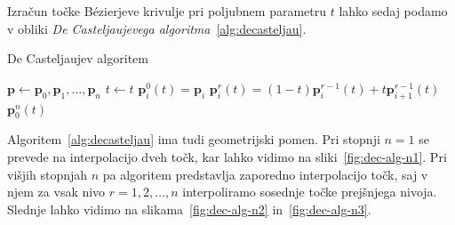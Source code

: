 \documentclass[isrm2, tisk]{fmfdelo}
\newcommand{\p}{\mathbf{p}}
\begin{document}
    \noindent Izračun točke Bézierjeve krivulje pri poljubnem parametru $t$ lahko sedaj podamo v obliki \textit{De Casteljaujevega algoritma}~\ref{alg:decasteljau}.
    \begin{algorithm}[H]
        \caption{De Casteljaujev algoritem}
        \label{alg:decasteljau}
        \begin{algorithmic}
            \State $\p \gets \p_0,\p_1,\dots,\p_n$
            \State $t \gets t$
                \State $\p_i^0(t)=\p_i$
            \EndFor
                    \State $\p_i^r(t)=(1-t)\p_i^{r-1}(t)+t\p_{i+1}^{r-1}(t)$
                \EndFor
            \EndFor
            \State \Return $\p_0^n(t)$
        \end{algorithmic}
    \end{algorithm}
    \noindent Algoritem~\ref{alg:decasteljau} ima tudi geometrijski pomen.
    Pri stopnji $n=1$ se prevede na interpolacijo dveh točk, kar lahko vidimo na sliki~\ref{fig:dec-alg-n1}.
    Pri višjih stopnjah $n$ pa algoritem predstavlja zaporedno interpolacijo točk, saj v njem za vsak nivo $r=1,2,\ldots,n$ interpoliramo sosednje točke prejšnjega nivoja.
    Slednje lahko vidimo na slikama~\ref{fig:dec-alg-n2} in~\ref{fig:dec-alg-n3}.
\end{document}
